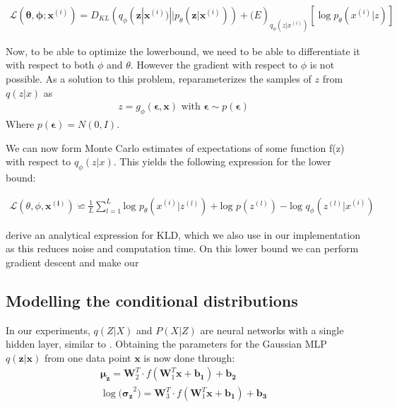 \documentclass{article}
\begin{document}
\begin{align}
\mathcal{L}(\mathbf{\theta}, \mathbf{\phi}; \mathbf{x}^{(i)}) = D_{KL}(q_\phi(\mathbf{z}|\mathbf{x}^{(i)}) || p_\theta(\mathbf{z}|\mathbf{x}^{(i)})) + \mathcal(E)_{q_\phi(z|x^{(i)})} [\log p_\theta(x^{(i)}|z)]
\end{align}

Now, to be able to optimize the lowerbound, we need to be able to differentiate it with respect to both $\phi$ and $\theta$. However the gradient with respect to $\phi$ is not possible. As a solution to this problem, \cite{kingma2013auto} reparameterizes the samples of $z$ from $q(z|x)$ as
\begin{align}
z = g_\phi(\mathbf{\epsilon},\mathbf{x}) \text{  with  } \mathbf{\epsilon} \sim p(\mathbf{\epsilon}) 
\end{align} 
Where $p(\mathbf{\epsilon}) = N(0,I)$.

We can now form Monte Carlo estimates of expectations of some function f(z) with respect to $q_\phi(z|x)$. This yields the following expression for the lower bound:

\begin{align}
\mathcal{L}(\theta ,\phi ,  \mathbf{x^{(i)}}) \backsimeq \frac{1}{L} \sum_{l=1}^{L} \text{log } p_{\theta} (x^{(i)}|z^{(l)})+ \text{log }p(z^{(l)}	)-\text{log }q_{\phi}(z^{(l)}|x^{(i)})
\end{align}

\cite{kingma2013auto} derive an analytical expression for KLD, which we also use in our implementation as this reduces noise and computation time. On this lower bound we can perform gradient descent and make our 


\subsection{Modelling the conditional distributions}
In our experiments, $q(Z|X)$ and $P(X|Z)$ are neural networks with a single hidden layer, similar to \cite{kingma2013auto}.  Obtaining the parameters for the Gaussian MLP $q(\mathbf{z}|\mathbf{x})$ from one data point $\mathbf{x}$ is now done through:
\begin{align}
\mathbf{\mu_z} = \mathbf{W}_2^T \cdot f(\mathbf{W}_1^T\mathbf{x}+\mathbf{b_1})+\mathbf{b_2} \\
\log\mathbf{(\sigma_z}^2) = \mathbf{W}_3^T \cdot f(\mathbf{W}_1^T\mathbf{x}+\mathbf{b_1})+\mathbf{b_3}
\end{align} 
 
\end{document}
